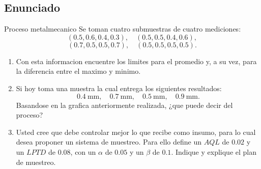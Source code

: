 \subsection{Enunciado}

\begin{enunciado}{Proceso metalmecanico}
Se toman cuatro submuestras de cuatro mediciones:
\[
(0.5,0.6,0.4,0.3),\quad
(0.5,0.5,0.4,0.6),
\]
\[
(0.7,0.5,0.5,0.7),\quad
(0.5,0.5,0.5,0.5).
\]

\begin{enumerate}[label=(\alph*)]
\item Con esta informacion encuentre los limites para el promedio y, a su vez, para la diferencia entre el maximo y minimo.

\item Si hoy toma una muestra la cual entrega los siguientes resultados:
\[
0.4\ \text{mm},\quad 0.7\ \text{mm},\quad 0.5\ \text{mm},\quad 0.9\ \text{mm}.
\]
Basandose en la grafica anteriormente realizada, ¿que puede decir del proceso?

\item Usted cree que debe controlar mejor lo que recibe como insumo, para lo cual desea proponer un sistema de muestreo. Para ello define un \(AQL\) de \(0.02\) y un \(LPTD\) de \(0.08\), con un \(\alpha\) de \(0.05\) y un \(\beta\) de \(0.1\). Indique y explique el plan de muestreo.
\end{enumerate}
\end{enunciado}
